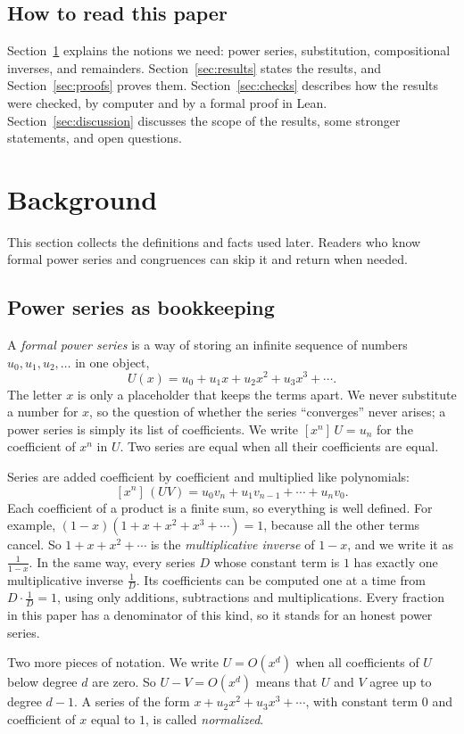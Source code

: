 \documentclass[11pt,a4paper]{article}
\theoremstyle{definition}
\theoremstyle{remark}
\newcommand{\coeff}[2]{[x^{#1}]\,#2}
\begin{document}
\subsection{How to read this paper}
Section~\ref{sec:background} explains the notions we need: power series, substitution, compositional inverses, and
remainders. Section~\ref{sec:results} states the results, and Section~\ref{sec:proofs} proves them.
Section~\ref{sec:checks} describes how the results were checked, by computer and by a formal proof in Lean.
Section~\ref{sec:discussion} discusses the scope of the results, some stronger statements, and open questions.
\section{Background}\label{sec:background}
This section collects the definitions and facts used later. Readers who know formal power series and congruences can skip it and return when needed.
\subsection{Power series as bookkeeping}
A \emph{formal power series} is a way of storing an infinite sequence of numbers $u_0,u_1,u_2,\dots$ in one object,
\[
U(x)=u_0+u_1x+u_2x^2+u_3x^3+\cdots .
\]
The letter $x$ is only a placeholder that keeps the terms apart. We never substitute a number for $x$, so the question
of whether the series ``converges'' never arises; a power series is simply its list of coefficients. We write
$\coeff{n}{U}=u_n$ for the coefficient of $x^n$ in $U$. Two series are equal when all their coefficients are equal.

Series are added coefficient by coefficient and multiplied like polynomials:
\[
\coeff{n}{(UV)}=u_0v_n+u_1v_{n-1}+\cdots+u_nv_0 .
\]
Each coefficient of a product is a finite sum, so everything is well defined. For example,
$(1-x)(1+x+x^2+x^3+\cdots)=1$, because all the other terms cancel. So $1+x+x^2+\cdots$ is the
\emph{multiplicative inverse} of $1-x$, and we write it as $\frac{1}{1-x}$. In the same way, every series $D$ whose
constant term is $1$ has exactly one multiplicative inverse $\frac1D$. Its coefficients can be computed one at a time
from $D\cdot\frac1D=1$, using only additions, subtractions and multiplications. Every fraction in this paper has a
denominator of this kind, so it stands for an honest power series.

Two more pieces of notation. We write $U=O(x^d)$ when all coefficients of $U$ below degree $d$ are zero. So
$U-V=O(x^d)$ means that $U$ and $V$ agree up to degree $d-1$. A series of the form $x+u_2x^2+u_3x^3+\cdots$, with
constant term $0$ and coefficient of $x$ equal to $1$, is called \emph{normalized}.
\end{document}
